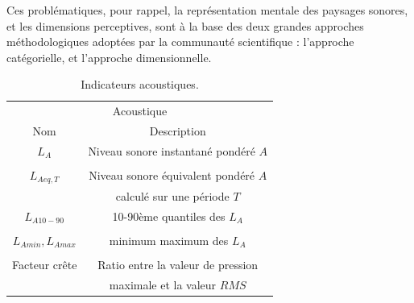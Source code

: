 Ces problématiques, pour rappel, la représentation mentale des paysages sonores, et les dimensions perceptives, sont à la base des deux grandes approches méthodologiques adoptées par la communauté scientifique : l'approche catégorielle, et l'approche dimensionnelle.  \\


\begin{table}[t]
\centering
\begin{tabular}{c c} 
\multicolumn{2}{c}{Acoustique} \\ 
Nom                           & Description            \\                                                            
\hline
$L_{A}$                                   & Niveau sonore instantané pondéré $A$     \\
                                          &                       \\
$L_{Aeq,T}$                               & Niveau sonore équivalent pondéré $A$    \\
                                          & calculé sur une période $T$       \\
$L_{A10-90}$                              & 10-90ème quantiles des $L_A$     \\
                                          &         \\
$L_{Amin}, L_{Amax}$                      & minimum maximum des $L_A$    \\
                                          &         \\
Facteur crête                             & Ratio entre la valeur de pression     \\
                                          & maximale et la valeur $RMS$        \\                                          
\hline
\end{tabular}
\vspace{0.5mm}
\caption{Indicateurs acoustiques.}
\label{tab:acousIndi}
\end{table}

